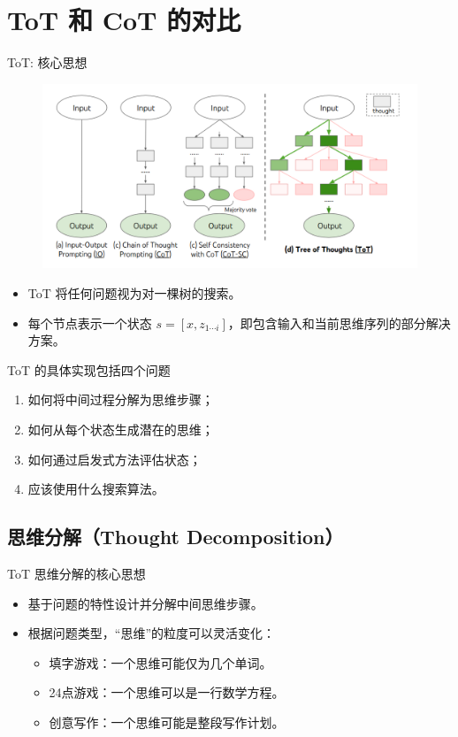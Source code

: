 \section{ToT 和 CoT 的对比}

\begin{frame}{ToT: 核心思想}
	\begin{figure}
        \centering
        \includegraphics[width=.5\linewidth]{./pic/7.png}
    \end{figure}
\begin{itemize}
    \item ToT 将任何问题视为对一棵树的搜索。
    \item 每个节点表示一个状态 $ s = [x, z_{1 \cdots i}] $，即包含输入和当前思维序列的部分解决方案。
\end{itemize}
\end{frame}

\begin{frame}{ToT 的具体实现包括四个问题}
\begin{enumerate}
    \item 如何将中间过程分解为思维步骤；
	\bigskip
    \item 如何从每个状态生成潜在的思维；
	\bigskip
    \item 如何通过启发式方法评估状态；
	\bigskip
    \item 应该使用什么搜索算法。
\end{enumerate}
\end{frame}

\subsection{思维分解（Thought Decomposition）}

\begin{frame}{ToT 思维分解的核心思想}
\begin{itemize}
    \item 基于问题的特性设计并分解中间思维步骤。
	
    \bigskip
    \item 根据问题类型，“思维”的粒度可以灵活变化：
    \begin{itemize}
        \item 填字游戏：一个思维可能仅为几个单词。
        \item 24点游戏：一个思维可以是一行数学方程。
        \item 创意写作：一个思维可能是整段写作计划。
    \end{itemize}
\end{itemize}
\end{frame}

